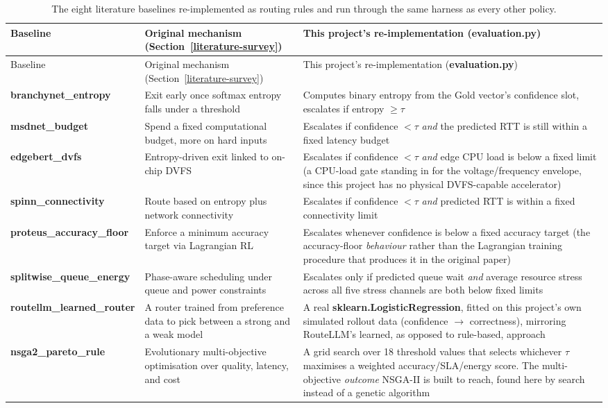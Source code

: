 {\small\setlength{\tabcolsep}{4pt}
\begin{longtable}{p{2.3cm}p{4.3cm}p{5.4cm}} \caption{The eight
literature baselines re-implemented as routing rules and run through the
same harness as every other policy.}\label{tab:baselines}\\ \toprule
Baseline & Original mechanism (Section~\ref{literature-survey}) & This project's
re-implementation (\textbf{evaluation.py}) \\ \midrule \endfirsthead
\toprule
Baseline & Original mechanism (Section~\ref{literature-survey}) & This project's
re-implementation (\textbf{evaluation.py}) \\ \midrule \endhead
\textbf{branchynet\_\-entropy} & Exit early once softmax entropy falls
under a threshold & Computes binary entropy from the Gold vector's
confidence slot, escalates if entropy $\geq \tau$ \\
\textbf{msdnet\_\-budget} & Spend a fixed computational budget, more on
hard inputs & Escalates if confidence $< \tau$ \emph{and} the predicted
RTT is still within a fixed latency budget \\ \textbf{edgebert\_\-dvfs}
& Entropy-driven exit linked to on-chip DVFS & Escalates if confidence
$< \tau$ \emph{and} edge CPU load is below a fixed limit (a CPU-load
gate standing in for the voltage/frequency envelope, since this project
has no physical DVFS-capable accelerator) \\
\textbf{spinn\_\-connectivity} & Route based on entropy plus network
connectivity & Escalates if confidence $< \tau$ \emph{and} predicted RTT
is within a fixed connectivity limit \\
\textbf{proteus\_\-accuracy\_\-floor} & Enforce a minimum accuracy
target via Lagrangian RL & Escalates whenever confidence is below a
fixed accuracy target (the accuracy-floor \emph{behaviour} rather
than the Lagrangian training procedure that produces it in the original paper) \\
\textbf{splitwise\_\-queue\_\-energy} & Phase-aware scheduling under
queue and power constraints & Escalates only if predicted queue wait
\emph{and} average resource stress across all five stress channels are
both below fixed limits \\ \textbf{routellm\_\-learned\_\-router} & A
router trained from preference data to pick between a strong and a weak
model & A real \textbf{sklearn.LogisticRegression}, fitted on this
project's own simulated rollout data (confidence $\to$ correctness),
mirroring RouteLLM's learned, as opposed to rule-based, approach \\
\textbf{nsga2\_\-pareto\_\-rule} & Evolutionary multi-objective
optimisation over quality, latency, and cost & A grid search over 18
threshold values that selects whichever $\tau$ maximises a weighted
accuracy/SLA/energy score. The multi-objective \emph{outcome} NSGA-II is
built to reach, found here by search instead of a genetic algorithm \\
\bottomrule \end{longtable} }


